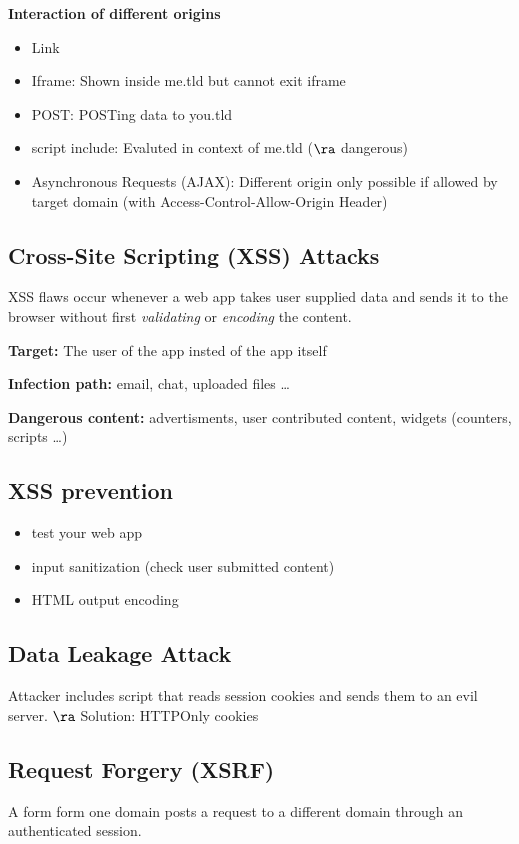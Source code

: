 \documentclass[fs, footer]{latex4ei}
\begin{document}
\begin{multicols*}{4}
\textbf{Interaction of different origins}
\begin{itemize}
  \item Link
  \item Iframe: Shown inside me.tld but cannot exit iframe
  \item POST: POSTing data to you.tld
  \item script include: Evaluted in context of me.tld ($\ra$ dangerous)
  \item Asynchronous Requests (AJAX): Different origin only possible if allowed by target domain (with Access-Control-Allow-Origin Header)
\end{itemize}

\subsection{Cross-Site Scripting (XSS) Attacks}
XSS flaws occur whenever a web app takes user supplied data and sends it to the browser without first \emph{validating} or \emph{encoding} the content.

\textbf{Target:} The user of the app insted of the app itself

\textbf{Infection path:} email, chat, uploaded files \ldots

\textbf{Dangerous content:} advertisments, user contributed content, widgets (counters, scripts \ldots)

\subsection{XSS prevention}
\begin{itemize}
  \item test your web app
  \item input sanitization (check user submitted content)
  \item HTML output encoding
\end{itemize}

\subsection{Data Leakage Attack}
Attacker includes script that reads session cookies and sends them to an evil server. $\ra$ Solution: HTTPOnly cookies

\subsection{Request Forgery (XSRF)}
A form form one domain posts a request to a different domain through an authenticated session.


\end{multicols*}
\end{document}

